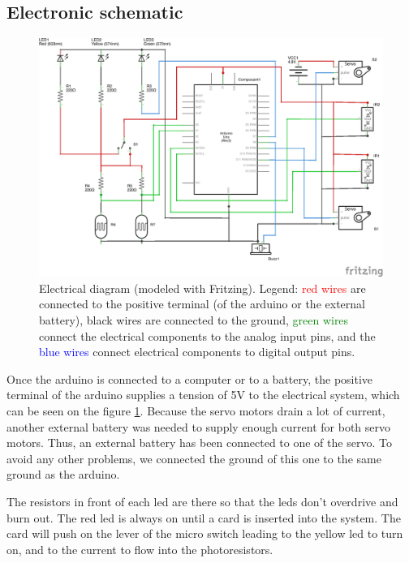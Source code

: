 \subsection{Electronic schematic}

\begin{figure}[!h]
	\centering
    \includegraphics[scale=1]{ElectronicScheme1.png}
    \caption{Electrical diagram (modeled with Fritzing). Legend: \textcolor{red}{red wires} are connected to the positive terminal (of the arduino or the external battery), black wires are connected to the ground, \textcolor{green}{green wires} connect the electrical components to the analog input pins, and the \textcolor{blue}{blue wires} connect electrical components to digital output pins.}
    \label{elecScheme}
\end{figure}

Once the arduino is connected to a computer or to a battery, the positive terminal of the arduino supplies a tension of 5V to the electrical system, which can be seen on the figure \ref{elecScheme}. Because the servo motors drain a lot of current, another external battery was needed to supply enough current for both servo motors. Thus, an external battery has been connected to one of the servo. To avoid any other problems, we connected the ground of this one to the same ground as the arduino.

The resistors in front of each led are there so that the leds don't overdrive and burn out. The red led is always on until a card is inserted into the system. The card will push on the lever of the micro switch leading to the yellow led to turn on, and to the current to flow into the photoresistors.

